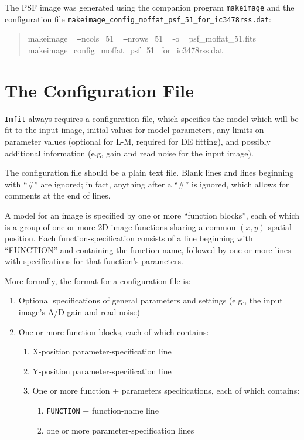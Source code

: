 \documentclass[10pt]{article}
\newcommand{\makeimage}{\texttt{makeimage}}
\begin{document}
The PSF image was generated using the companion program \makeimage{} and the configuration
file \texttt{makeimage\_config\_moffat\_psf\_51\_for\_ic3478rss.dat}:
\begin{quote}
makeimage ~ \texttt{--}ncols=51 ~ \texttt{--}nrows=51 ~ -o ~ psf\_moffat\_51.fits ~ makeimage\_config\_moffat\_psf\_51\_for\_ic3478rss.dat  
\end{quote}



\section{The Configuration File}\label{sec:configfile}

\texttt{Imfit} always requires a configuration file, which specifies the
model which will be fit to the input image, initial values for model parameters, any limits on
parameter values (optional for L-M, required for DE fitting), and
possibly additional information (e.g, gain and read noise for the
input image).

The configuration file should be a plain text file. Blank lines and
lines beginning with ``\#'' are ignored; in fact, anything after a
``\#'' is ignored, which allows for comments at the end of lines.

A model for an image is specified by one or more ``function blocks'',
each of which is a group of one or more 2D image functions sharing a
common $(x,y)$ spatial position. Each function-specification consists of
a line beginning with ``FUNCTION'' and containing the function name,
followed by one or more lines with specifications for that function's parameters.

\bigskip

More formally, the format for a configuration file is:
\begin{enumerate}
\item Optional specifications of general parameters and settings (e.g., the
input image's A/D gain and read noise)
\item One or more function blocks, each of which contains:
\begin{enumerate}
\item X-position parameter-specification line
\item Y-position parameter-specification line
\item One or more function + parameters specifications, each of which contains:
\begin{enumerate}
\item \texttt{FUNCTION} + function-name line
\item one or more parameter-specification lines
\end{enumerate}
\end{enumerate}
\end{enumerate}
\end{document}
